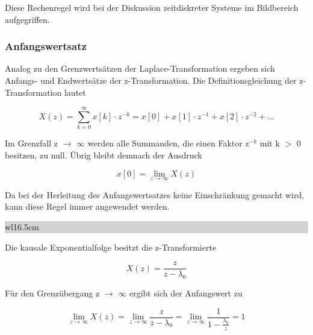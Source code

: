 \noindent Diese Rechenregel wird bei der Diskussion zeitdiskreter Systeme im Bildbereich aufgegriffen.

\subsubsection{Anfangswertsatz}

\noindent Analog zu den Grenzwerts\"{a}tzen der Laplace-Transformation ergeben sich Anfangs- und Endwerts\"{a}tze der z-Transformation. Die Definitionsgleichung der z-Transformation lautet

\begin{equation}\label{eq:fiveseventyone}
X\left(z\right)=\sum _{k=0}^{\infty }x\left[k\right]\cdot z^{-k}  =x\left[0\right]+x\left[1\right]\cdot z^{-1} +x\left[2\right]\cdot z^{-2} +...
\end{equation}

\noindent Im Grenzfall z $\rightarrow$ $\infty$ werden alle Summanden, die einen Faktor z${}^{-k}$ mit k $\mathrm{>}$ 0 besitzen, zu null. \"{U}brig bleibt demnach der Ausdruck

\begin{equation}\label{eq:fiveseventytwo}
x\left[0\right]={\mathop{\lim }\limits_{z\to \infty }} X\left(z\right)
\end{equation}

\noindent Da bei der Herleitung des Anfangswertsatzes keine Einschr\"{a}nkung gemacht wird, kann diese Regel immer angewendet werden.\bigskip

\noindent
\colorbox{lightgray}{%
%
\renewcommand\arraystretch{0.6}%
\begin{tabular}{ wl{16.5cm} }
{\selectfont{Beispiel: Anfangswertsatz}}
\end{tabular}%
}\medskip

\noindent Die kausale Exponentialfolge besitzt die z-Transformierte 

\begin{equation}\label{eq:fiveseventythree}
X\left(z\right)=\frac{z}{z-\lambda _{0} }
\end{equation}

\noindent F\"{u}r den Grenz\"{u}bergang z $\rightarrow$ $\infty$ ergibt sich der Anfangswert zu

\begin{equation}\label{eq:fiveseventyfour}
{\mathop{\lim }\limits_{z\to \infty }} X\left(z\right)={\mathop{\lim }\limits_{z\to \infty }} \frac{z}{z-\lambda _{0} } ={\mathop{\lim }\limits_{z\to \infty }} \frac{1}{1-\frac{\lambda _{0} }{z} } =1
\end{equation}

